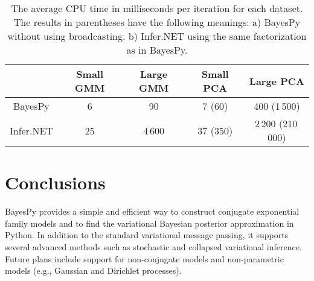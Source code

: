 \documentclass[twoside,11pt]{article}
\begin{document}
\begin{table}[tb]
  \centering
  \caption{
    The average CPU time in milliseconds per iteration for each
    dataset.  The results in parentheses have the following meanings: a) BayesPy without using
    broadcasting. b) Infer.NET using the same factorization as in
    BayesPy.
  }
  \small
  \begin{tabular}{ccccc}
    &
    Small GMM
    &
    Large GMM
    &
    Small PCA
    &
    Large PCA
    \\
    \hline
    BayesPy     & 6 & 90  & 7 (60) & 400 (1\,500)
    \\
    Infer.NET   & 25 & 4\,600 & 37 (350) & 2\,200 (210\,000)
  \end{tabular}
  \label{tab:speed}
\end{table}


\section{Conclusions}

BayesPy provides a simple and efficient way to construct conjugate exponential
family models and to find the variational Bayesian posterior approximation in
Python.
%
In addition to the standard variational message passing, it supports several
advanced methods such as stochastic and collapsed variational inference.  Future
plans include support for non-conjugate models and non-parametric models (e.g.,
Gaussian and Dirichlet processes).







\vskip 0.2in
\small

\end{document}
